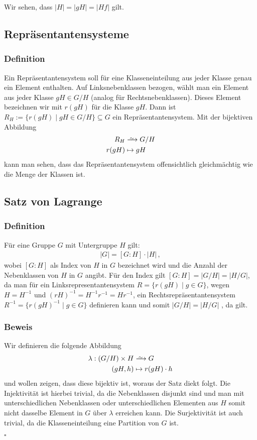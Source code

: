 \documentclass[12pt, german]{article}
\newcommand\iso{\xrightarrow{
		\,\smash{\raisebox{-0.65ex}{\ensuremath{\scriptstyle\sim}}}\,}}
\newcommand{\bewiesen}{
	
	\begin{flushright}
		$\square$  \\
\end{flushright}}
\begin{document}
	Wir sehen, dass $|H|=|gH| = |Hf|$ gilt.
	
	\subsection{Repräsentantensysteme}		
	\subsubsection{Definition}
	Ein Repräsentantensystem soll für eine Klasseneinteilung aus jeder Klasse genau ein Element enthalten.
	Auf Linksnebenklassen bezogen, wählt man ein Element aus jeder Klasse $gH \in G/H$ (analog für Rechtsnebenklassen).
	Dieses Element bezeichnen wir mit $r(gH)$ für die Klasse $gH$. 
	Dann ist $R_H := \{r(gH) \mid gH \in G/H\} \subseteq G$ ein Repräsentantensystem.
	Mit der bijektiven  Abbildung
	\begin{align*}
		R_H &\iso G/H \\
		r(gH) &\mapsto gH 
	\end{align*}
	kann man sehen, dass das Repräsentantensystem offensichtlich gleichmächtig wie die Menge der Klassen ist.
	\subsection{Satz von Lagrange}	
	\subsubsection{Definition}
	Für eine Gruppe $G$ mit Untergruppe $H$ gilt:
	\begin{align*}
		|G| = [G:H] \cdot |H|\, ,
	\end{align*}	
	wobei $[G:H]$ als Index von $H$ in $G$ bezeichnet wird und die Anzahl der Nebenklassen von $H$ in $G$ angibt. Für den Index gilt $[G:H] = |G/H| = |H/G|$, da man für ein Linksrepresentantensystem $R = \{r(gH) \mid g \in G \}$, wegen $H=H^{-1}$ und $(rH)^{-1} = H^{-1}r^{-1} = Hr^{-1}$, ein Rechtsrepräsentantensystem
	$R^{-1} = \{r(gH)^{-1} \mid g \in G \}$ definieren kann und somit $|G/H| = |H/G|$ , da gilt.
	
	\subsubsection{Beweis}
	Wir definieren die folgende Abbildung
	\begin{align*}
		\lambda: (G/H) \times H &\iso G \\
		(gH, h) &\mapsto r(gH) \cdot h
	\end{align*}
	und wollen zeigen, dass diese bijektiv ist, woraus der Satz diekt folgt.
	Die Injektivität ist hierbei trivial, da die Nebenklassen disjunkt sind und man mit unterschiedlichen Nebenklassen oder unterschiedlichen Elementen aus $H$ somit nicht dasselbe Element in $G$ über $\lambda$ erreichen kann. Die Surjektivität ist auch trivial, da die Klasseneinteilung eine Partition von $G$ ist.
	\bewiesen	
	
\end{document}

